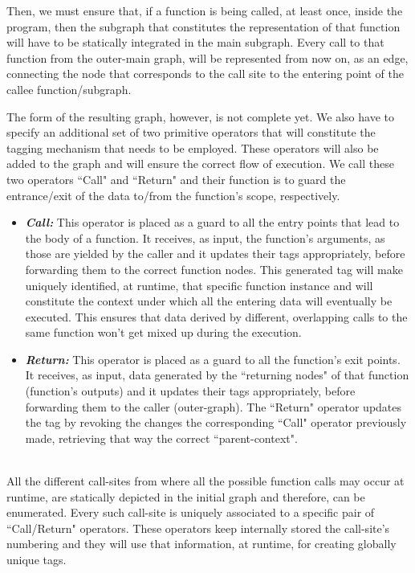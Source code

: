 \documentclass[ack,preface]{dithesis}
\begin{document}
Then, we must ensure that, if a function is being called, at least once, inside the program, then the subgraph that constitutes the representation of that function will have to be statically integrated in the main subgraph. Every call to that function from the outer-main graph, will be represented from now on, as an edge, connecting the node that corresponds to the call site to the entering point of the callee function/subgraph.

The form of the resulting graph, however, is not complete yet. We also have to specify an additional set of two primitive operators that will constitute the tagging mechanism that needs to be employed. These operators will also be added to the graph and will ensure the correct flow of execution.
We call these two operators ``Call" and ``Return" and their function is to guard the entrance/exit of the data to/from the function's scope, respectively.

    \begin{itemize}

    \item \textit{\textbf{Call:}} This operator is placed as a guard to all the entry points that lead to the body of a function. It receives, as input, the function's arguments, as those are yielded by the caller and it updates their tags appropriately, before forwarding them to the correct function nodes. This generated tag will make uniquely identified, at runtime, that specific function instance and will constitute the context under which all the entering data will eventually be executed. This ensures that data derived by different, overlapping calls to the same function won't get mixed up during the execution.

    \item \textit{\textbf{Return:}} This operator is placed as a guard to all the function's exit points. It receives, as input, data generated by the ``returning nodes" of that function (function's outputs) and it updates their tags appropriately, before forwarding them to the caller (outer-graph).  The ``Return" operator updates the tag by revoking the changes the corresponding ``Call" operator previously made, retrieving that way the correct ``parent-context".\\\\

    \end{itemize}

All the different call-sites from where all the possible function calls may occur at runtime, are statically depicted in the initial graph and therefore, can be enumerated.
Every such call-site is uniquely associated to a specific pair of ``Call/Return" operators. These operators keep internally stored the call-site's numbering and they will use that information, at runtime, for creating globally unique tags. 
\end{document}
